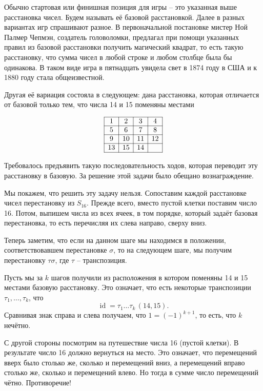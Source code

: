 \documentclass[10pt,a4paper,oneside]{book}
\theoremstyle{definition}
\newcommand{\id}{\operatorname{id}}
\begin{document}
Обычно стартовая или финишная позиция для игры -- это указанная выше расстановка чисел. Будем называть её базовой расстановкой.
Далее в разных вариантах игр спрашивают разное. В первоначальной постановке мистер Ной Палмер Чепмэн, создатель головоломки, предлагал при помощи указанных правил из базовой расстановки получить магический квадрат, то есть такую расстановку, что сумма чисел в любой строке и любом столбце была бы одинакова. В таком виде игра в пятнадцать увидела свет в 1874 году в США и к 1880 году стала общеизвестной. 

Другая её вариация состояла в следующем: дана расстановка, которая отличается от базовой только тем, что числа 14 и 15 поменяны местами

$$\begin{array}{|c|c|c|c|}
\hline
1 & 2 & 3 & 4\\
\hline
5 & 6 & 7 & 8\\
\hline
9& 10& 11& 12\\
\hline
13& 15& 14&\\
\hline
\end{array}
$$

Требовалось предъявить такую последовательность ходов, которая переводит эту расстановку в базовую. За решение этой задачи было обещано вознаграждение.

Мы покажем, что решить эту задачу нельзя. Сопоставим каждой расстановке чисел перестановку из $S_{16}$. Прежде всего, вместо пустой клетки поставим число 16. Потом, выпишем числа из всех ячеек, в том порядке, который задаёт базовая перестановка, то есть перечисляя их слева направо, сверху вниз.

Теперь заметим, что если на данном шаге мы находимся в положении, соответствовавшем перестановке $\sigma$, то на следующем шаге, мы получим перестановку $\tau \sigma$, где $\tau$ -- транспозиция.

Пусть мы за $k$ шагов получили из расположения в котором поменяны 14 и 15 местами базовую расстановку. Это означает, что есть некоторые транспозиции $\tau_1,\dots, \tau_k$, что 
$$\id= \tau_1\dots \tau_k\,(14,15).$$
Сравнивая знак справа и слева получаем, что $1=(-1)^{k+1}$, то есть, что $k$ нечётно.

С другой стороны посмотрим на путешествие числа 16 (пустой клетки). В результате число 16 должно вернуться на место. Это означает, что перемещений вверх было столько же, сколько и перемещений вниз, а перемещений вправо столько же, сколько и перемещений влево. Но тогда в сумме число перемещений чётно. Противоречие!
\end{document}
